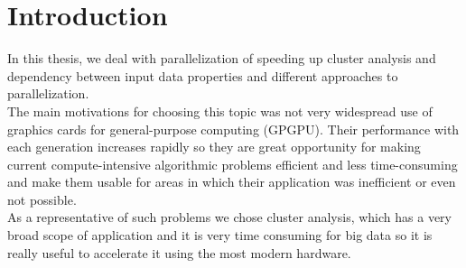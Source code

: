 \pagestyle{plain}
\setcounter{page}{1}

\chapter{Introduction}

In this thesis, we deal with parallelization of speeding up cluster analysis and dependency between input data properties and different approaches to parallelization.\\
The main motivations for choosing this topic was not very widespread use of graphics cards for general-purpose computing (GPGPU). Their performance with each generation increases rapidly so they are great opportunity for making current compute-intensive algorithmic problems efficient and less time-consuming and make them usable for areas in which their application was inefficient or even not possible.\\
As a representative of such problems we chose cluster analysis, which has a very broad scope of application and it is very time consuming for big data so it is really useful to accelerate it using the most modern hardware.

